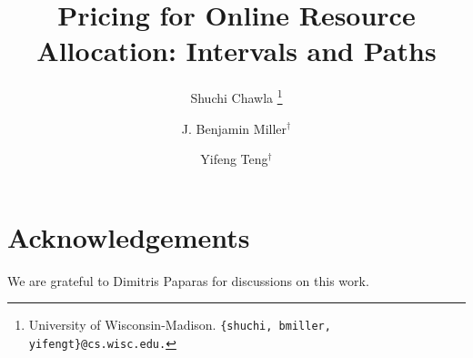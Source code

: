 \documentclass[11pt]{article}
\theoremstyle{definition}
\begin{document}
\title{Pricing for Online Resource Allocation: Intervals and
  Paths}
\author{Shuchi Chawla
\thanks{
    {University of Wisconsin-Madison}. \tt{\{shuchi, bmiller, yifengt\}@cs.wisc.edu.}}
\and J. Benjamin Miller$^\dagger$
\and Yifeng Teng$^\dagger$
}
\date{}

\maketitle
\thispagestyle{empty}

\begin{abstract}

\end{abstract}
\newpage

\setcounter{page}{1}




    
    
    


	
	


\section*{Acknowledgements}
We are grateful to Dimitris Paparas for discussions on this work.




\end{document}
